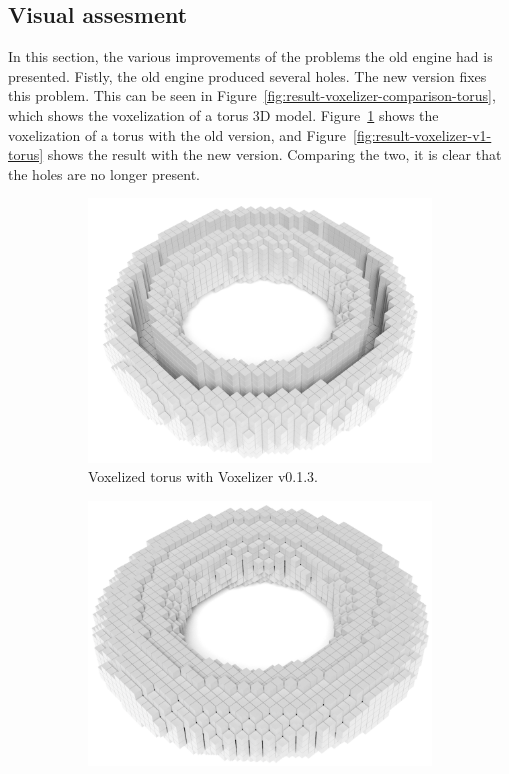 \subsection{Visual assesment}
\label{sec:method-visual-assesment}
In this section, the various improvements of the problems the old engine had is presented. Fistly, the old engine produced several holes. The new version fixes this problem. This can be seen in Figure~\ref{fig:result-voxelizer-comparison-torus}, which shows the voxelization of a torus 3D model. Figure~\ref{fig:result-voxelizer-v0.1.3-torus} shows the voxelization of a torus with the old version, and Figure~\ref{fig:result-voxelizer-v1-torus} shows the result with the new version. Comparing the two, it is clear that the holes are no longer present.
\begin{figure}[htp]
    \centering
    \begin{subfigure}[b]{0.49\textwidth}
        \centering
        \includegraphics[width=\textwidth]{sections/theory/figures/voxelizer-v013-torus-40.png}
        \caption{Voxelized torus with Voxelizer v0.1.3.}
        \label{fig:result-voxelizer-v0.1.3-torus}
    \end{subfigure}
    \hfill
    \begin{subfigure}[b]{0.49\textwidth}
        \centering
        \includegraphics[width=\textwidth]{sections/result/figures/torus-voxelized-v1-40.png}

\end{subfigure}
\end{figure}
